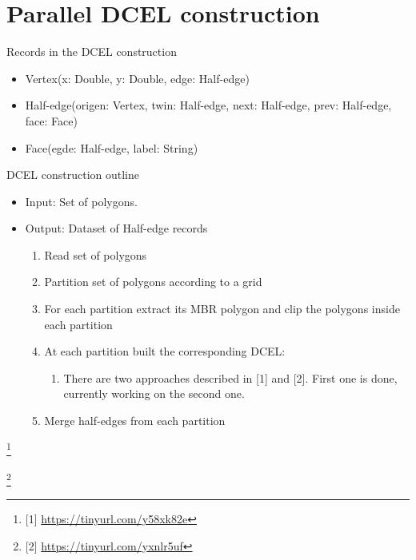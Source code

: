 \documentclass{beamer}
\newcommand\blfootnote[1]{%

  \begingroup

  \renewcommand\thefootnote{}\footnote{#1}%

  \addtocounter{footnote}{-1}%

  \endgroup

}
\begin{document}
\section{Parallel DCEL construction}
\begin{frame}{Records in the DCEL construction}
    \begin{itemize}
        \item Vertex(x: Double, y: Double, edge: Half-edge)
        \item Half-edge(origen: Vertex, twin: Half-edge, next: Half-edge, prev: Half-edge, face: Face)
        \item Face(egde: Half-edge, label: String)
    \end{itemize}
\end{frame}

\begin{frame}{DCEL construction outline}
    \begin{itemize}
        \item Input: Set of polygons.
        \item Output: Dataset of Half-edge records
        \begin{enumerate}
         \item Read set of polygons
         \item Partition set of polygons according to a grid
         \item For each partition extract its MBR polygon and clip the polygons inside each partition
         \item At each partition built the corresponding DCEL:
            \begin{enumerate}
             \item There are two approaches described in [1] and [2].  First one is done, currently working on the second one.
            \end{enumerate}
        \item Merge half-edges from each partition
        \end{enumerate}
    \end{itemize}
    
    \blfootnote{[1] \url{https://tinyurl.com/y58xk82e}}
    \blfootnote{[2] \url{https://tinyurl.com/yxnlr5uf}}
\end{frame}
\end{document}

